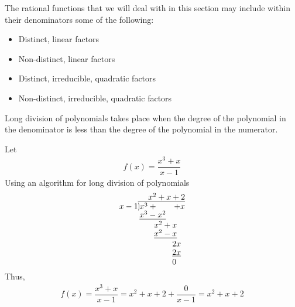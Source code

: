 \begin{note}
The rational functions that we will deal with in this section may include within their denominators some of the following:
\begin{itemize}
    \item Distinct, linear factors
    \item Non-distinct, linear factors
    \item Distinct, irreducible, quadratic factors
    \item Non-distinct, irreducible, quadratic factors
\end{itemize}
\label{four_cases_for_partial_fractions}
\end{note}

\begin{recall}
Long division of polynomials takes place when the degree of the polynomial in the denominator is less than the degree of the polynomial in the numerator.
\end{recall}

\begin{example}
Let
\begin{align*}
    f(x) = \dfrac{x^{3} + x}{x - 1}
\end{align*}
Using an algorithm for long division of polynomials
\begin{align*}
\setstackgap{S}{1.5pt}
\stackMath\def\stackalignment{r}
\stackunder{
  x-1 \stackon[1pt]{\showdiv{x^{3} + \hspace{20pt} + x}}{x^{2} + x + 2}
}{
  \Shortstack[l]{{\underline{x^{3}-x^{2}}\ph{\hspace{10pt} + x}} \ph{x^{3}-}x^{2}+x {\ph{x^{3}-}\underline{x^{2}-x}} \ph{x^{3}-x^{2}-}2x {\ph{x^{3}-x^{2}-}\underline{2x}} 
   \ph{x^{3}-x^{2}-}0}
  }
\end{align*}
Thus,
\begin{align*}
    f(x) = \dfrac{x^{3} + x}{x - 1} = x^{2} + x + 2 + \dfrac{0}{x - 1} = x^{2} + x + 2
\end{align*}
\end{example}

